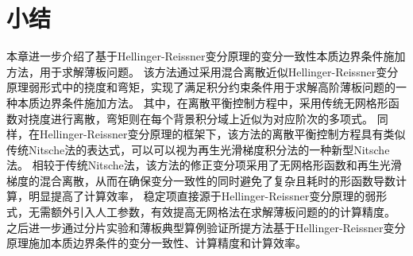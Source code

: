 \section{小结}
本章进一步介绍了基于Hellinger-Reissner变分原理的变分一致性本质边界条件施加方法，用于求解薄板问题。
该方法通过采用混合离散近似Hellinger-Reissner变分原理弱形式中的挠度和弯矩，实现了满足积分约束条件用于求解高阶薄板问题的一种本质边界条件施加方法。
其中，在离散平衡控制方程中，采用传统无网格形函数对挠度进行离散，弯矩则在每个背景积分域上近似为对应阶次的多项式。
同样，在Hellinger-Reissner变分原理的框架下，该方法的离散平衡控制方程具有类似传统Nitsche法的表达式，可以可以视为再生光滑梯度积分法的一种新型Nitsche法。
相较于传统Nitsche法，该方法的修正变分项采用了无网格形函数和再生光滑梯度的混合离散，从而在确保变分一致性的同时避免了复杂且耗时的形函数导数计算，明显提高了计算效率，
稳定项直接源于Hellinger-Reissner变分原理的弱形式，无需额外引入人工参数，有效提高无网格法在求解薄板问题的的计算精度。
之后进一步通过分片实验和薄板典型算例验证所提方法基于Hellinger-Reissner变分原理施加本质边界条件的变分一致性、计算精度和计算效率。





